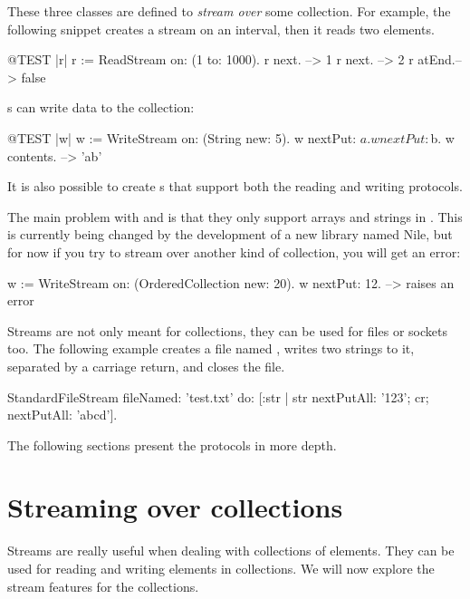 \documentclass[a4paper,10pt,twoside]{book}
\begin{document}
These three classes are defined to \emph{stream over} some collection.
For example, the following snippet creates a stream on an interval,
then it reads two elements.
\begin{code}{@TEST |r|}
r := ReadStream on: (1 to: 1000).
r next.   --> 1
r next.   --> 2
r atEnd.--> false
\end{code}

s can write data to the collection:
\begin{code}{@TEST |w|}
w := WriteStream on: (String new: 5).
w nextPut: $a.
w nextPut: $b.
w contents. -->  'ab'
\end{code}

It is also possible to create s that support both
the reading and writing protocols.

The main problem with  and  is
that they only support arrays and strings in \pharo. This is currently
being changed by the development of a new library named Nile, 
but for now if you try to stream over another kind of
collection, you will get an error:

\begin{code}{}
w := WriteStream on: (OrderedCollection new: 20).
w nextPut: 12. -->  raises an error
\end{code}

Streams are not only meant for collections, they can be used for files or sockets
too. The following example creates a file named , writes two strings to it, separated by a carriage return, and closes the file.

\begin{code}{}
StandardFileStream
  fileNamed: 'test.txt'
  do: [:str | str
                nextPutAll: '123';
                cr;
                nextPutAll: 'abcd'].
\end{code}

The following sections present the protocols in more depth.

\section{Streaming over collections}

Streams are really useful when dealing with collections of
elements. They can be used for reading and writing elements in
collections. We will now explore the stream features for the
collections.
\end{document}
